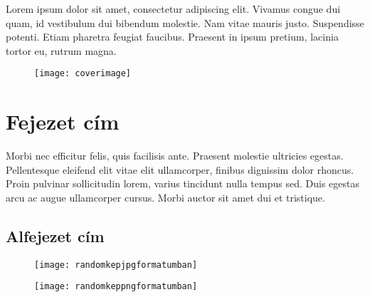 \documentclass{labreport}
\subtitle{Alcím}
\begin{document}
\maketitle %
\thispagestyle{empty} %


\vspace{50pt}
\noindent 
Lorem ipsum dolor sit amet, consectetur adipiscing elit. Vivamus congue dui quam, id vestibulum dui bibendum molestie. Nam vitae mauris justo. Suspendisse potenti. Etiam pharetra feugiat faucibus. Praesent in ipsum pretium, lacinia tortor eu, rutrum magna. 

\begin{figure}[H]
  \centering
  \texttt{[image: coverimage]}
\end{figure}
\vspace{-20pt}

\clearpage


\pagestyle{myheadings} %


\section{Fejezet cím}
\label{sec:intro}

Morbi nec efficitur felis, quis facilisis ante. Praesent molestie ultricies egestas. Pellentesque eleifend elit vitae elit ullamcorper, finibus dignissim dolor rhoncus. Proin pulvinar sollicitudin lorem, varius tincidunt nulla tempus sed. Duis egestas arcu ac augue ullamcorper cursus. Morbi auctor sit amet dui et tristique. 



\newpage
\subsection{Alfejezet cím}
\label{subsec:modelling}

\begin{figure}[H]
  \centering
  \texttt{[image: randomkepjpgformatumban]}
\end{figure}
\vspace{-20pt}
\begin{figure}[H]
  \centering
  \texttt{[image: randomkeppngformatumban]}
\end{figure}
\vspace{-20pt}
\end{document}
